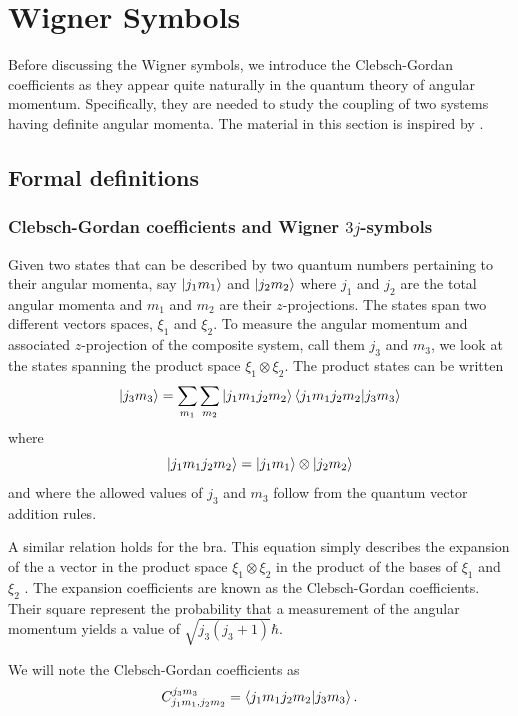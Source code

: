 \section{Wigner Symbols}\label{sec:app.wignerSymbols}
Before discussing the Wigner symbols, we introduce the Clebsch-Gordan
coefficients as they appear quite naturally in the quantum theory
of angular momentum. Specifically, they are needed to study the coupling
of two systems having definite angular momenta. The material in this section
is inspired by \cite{VAR1988,BRI1993}. 

\subsection{Formal definitions}
\subsubsection{Clebsch-Gordan coefficients and Wigner $3j$-symbols}
Given two states that can be described by two quantum numbers
pertaining to their angular momenta, say $\ket{j_1m_1}$
and $\ket{j_2m_2}$ where $j_1$ and $j_2$ are the total
angular momenta and $m_1$ and $m_2$ are their $z$-projections. 
The states span two different vectors spaces, $\xi_1$ and $\xi_2$. 
To measure the angular momentum and associated $z$-projection
of the composite system, call them $j_3$ and $m_3$, we look at
the states spanning the product space $\xi_1\otimes\xi_2$. The product
states can be written
  \begin{equation}
   \ket{j_3m_3} = \sum_{m_1}\sum_{m_2}\ket{j_1m_1j_2m_2}\braket{j_1m_1j_2m_2|j_3m_3}
  \end{equation}
where
  \begin{equation*}
   \ket{j_1m_1j_2m_2}=\ket{j_1m_1}\otimes\ket{j_2m_2}
  \end{equation*}
and where the allowed values of $j_3$ and $m_3$ follow 
from the quantum vector addition rules. 

A similar relation holds for the bra. This equation simply 
describes the expansion of the a vector in the product space
$\xi_1\otimes\xi_2$ in the product of the bases of $\xi_1$ 
and $\xi_2$ \cite{COH1973b}. The expansion coefficients are known as the 
Clebsch-Gordan coefficients. Their square represent 
the probability that a measurement of the angular momentum 
yields a value of $\sqrt{j_3(j_3+1)}\hbar$.

We will note the Clebsch-Gordan coefficients
as
  \begin{equation}
    C^{j_3m_3}_{j_1m_1,j_2m_2} = \braket{j_1m_1j_2m_2|j_3m_3}.
  \end{equation}

